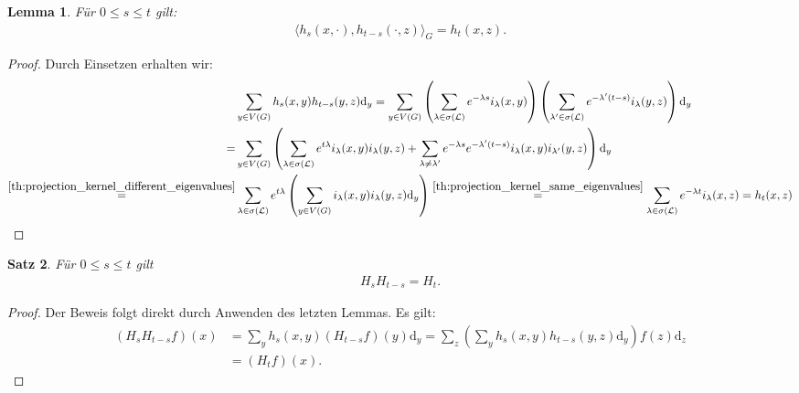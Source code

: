 \documentclass[headsepline,11pt]{scrbook}
\newtheorem{lem}{Lemma}[section]
\newtheorem{thm}[lem]{Satz}
\theoremstyle{definition}
\begin{document}
\begin{lem}
	F\"ur $ 0 \leq s \leq t $ gilt:
	\begin{align}
	\langle h_s(x,\cdot), h_{t-s}(\cdot,z) \rangle_G
	=
	h_t(x,z).
	\end{align}
\end{lem}

\begin{proof}
	Durch Einsetzen erhalten wir:
	\begin{align*}
	&\sum 
	\limits_{y \in V(G)}
	h_s(x,y) h_{t-s}(y,z) 
	\mathrm{d}_y
	=
	\sum \limits_{y \in V(G)}
	\left(\sum \limits_{\lambda \in \sigma(\mathcal{L})}
	e^{-\lambda s}
	i_\lambda(x,y)
	\right)
	\left(\sum \limits_{\lambda^\prime \in \sigma(\mathcal{L})}
	e^{-\lambda^\prime (t-s)}
	i_\lambda(y,z)
	\right)
	\mathrm{d}_y\\
	=
	&\sum \limits_{y \in V(G)}
	\left(
	\sum \limits_{\lambda \in \sigma(\mathcal{L})}
	e^{t\lambda}
	i_\lambda(x,y) i_\lambda(y,z)
	+
	\sum \limits_{\lambda \neq \lambda^\prime}
	e^{-\lambda s} e^{- \lambda^\prime(t-s)}
	i_\lambda(x,y)i_{\lambda^\prime}(y,z)
	\right)
	\mathrm{d}_y\\
	\overset{\ref{th:projection_kernel_different_eigenvalues}}{=}
	&\sum \limits_{\lambda\in \sigma(\mathcal{L})}
	e^{t \lambda}
	\left(\sum \limits_{y \in V(G)} 
	i_\lambda(x,y) i_\lambda(y,z) \mathrm{d}_y
	\right)
	\overset{\ref{th:projection_kernel_same_eigenvalues}}{=}
	\sum \limits_{\lambda \in \sigma(\mathcal{L})}
	e^{-\lambda t} i_\lambda(x,z)
	= h_t(x,z)
	\end{align*}
\end{proof}

\begin{thm}
	F\"ur $ 0 \leq s \leq t $ gilt
	\begin{align}
	H_{s} H_{t-s} = H_t.
	\end{align}
\end{thm}

\begin{proof}
	Der Beweis folgt direkt durch Anwenden des letzten Lemmas.
	Es gilt:
	\begin{align*}
	(H_s H_{t-s} f)(x)
	&=
	\sum_y h_s(x,y) (H_{t-s} f)(y) \mathrm{d}_y
	=
	\sum_z \left(\sum_y h_s(x,y) h_{t-s}(y,z) \mathrm{d}_y \right) f(z) \mathrm{d}_z\\ 
	&= (H_t f)(x).
	\end{align*}
\end{proof}
\end{document}
